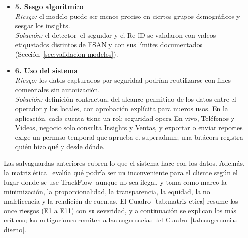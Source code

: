 \documentclass[12pt,a4paper]{article}
\begin{document}
\begin{itemize}
    \item \textbf{5. Sesgo algorítmico} \\
    \textit{Riesgo:} el modelo puede ser menos preciso en ciertos grupos
    demográficos y sesgar los insights. \\
    \textit{Solución:} el detector, el seguidor y el Re-ID se validaron con
    videos etiquetados distintos de ESAN y con sus límites documentados
    (Sección~\ref{sec:validacion-modelos}).

    \item \textbf{6. Uso del sistema} \\
    \textit{Riesgo:} los datos capturados por seguridad podrían
    reutilizarse con fines comerciales sin autorización. \\
    \textit{Solución:} definición contractual del alcance permitido de
    los datos entre el operador y los locales, con aprobación explícita
    para nuevos usos. En la aplicación, cada cuenta tiene un rol: seguridad
    opera En vivo, Teléfonos y Videos, negocio solo consulta Insights y Ventas,
    y exportar o enviar reportes exige un permiso temporal que aprueba el
    superadmin; una bitácora registra quién hizo qué y desde dónde.
\end{itemize}

Las salvaguardas anteriores cubren lo que el sistema hace con los datos. Además,
la matriz ética~\cite{matrices2026} evalúa qué podría ser un inconveniente para
el cliente según el lugar donde se use TrackFlow, aunque no sea ilegal, y toma
como marco la minimización, la proporcionalidad, la transparencia, la equidad,
la no maleficencia y la rendición de cuentas. El Cuadro~\ref{tab:matriz-etica}
resume los once riesgos (E1 a E11) con su severidad, y a continuación se
explican los más críticos; las mitigaciones remiten a las sugerencias del
Cuadro~\ref{tab:sugerencias-diseno}.
\end{document}
